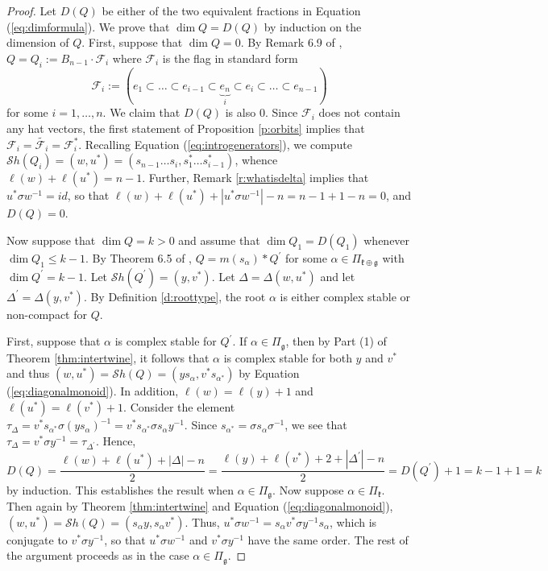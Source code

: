 \documentclass[12pt]{amsart}
\numberwithin{equation}{section}
\newcommand{\fk}{\mbox{${\mathfrak k}$}}
\newcommand{\fg}{\mbox{${\mathfrak g}$}}
\newcommand{\F}{\mathcal{F}}
\newcommand{\Sh}{\mathcal{S}h}
\begin{document}
\begin{proof}
Let $D(Q)$ be either of the two equivalent fractions in Equation (\ref{eq:dimformula}).   We prove that $\dim Q=D(Q)$ by induction on the dimension of $Q$.  First, suppose that $\dim Q=0$.  By Remark 6.9 of \cite{CE21II}, $Q=Q_{i}:=B_{n-1}\cdot \F_{i}$ where $\F_{i}$ is the flag in standard form 
$$
\F_{i}:=(e_{1}\subset\dots \subset e_{i-1}\subset\underbrace{e_{n}}_{i}\subset e_{i}\subset \dots \subset e_{n-1}) 
$$
for some $i=1,\dots, n$.  We claim that $D(Q)$ is also $0$. Since $\F_{i}$ does not contain any hat vectors, the first statement of Proposition \ref{p:orbits} implies that $\F_{i}=\widetilde{\F_{i}}=\F_{i}^{*}$.  Recalling Equation (\ref{eq:introgenerators}),  we compute $\Sh(Q_{i})=(w, u^{*})=(s_{n-1}\dots s_{i}, s_{1}^{*}\dots s_{i-1}^{*})$, whence $\ell(w)+\ell(u^{*})=n-1$.  Further, Remark \ref{r:whatisdelta} implies that $u^{*}\sigma w^{-1}=id$, so that $\ell(w)+\ell(u^{*})+|u^{*}\sigma w^{-1}|-n=n-1+1-n=0$, and $D(Q)=0.$

Now suppose that $\dim Q=k>0$ and assume that $\dim Q_1 = D(Q_1)$ whenever $\dim Q_1 \le k-1$.  By Theorem 6.5 of \cite{CE21II},  $Q=m(s_{\alpha})*Q^{\prime}$ for some $\alpha\in \Pi_{\fk\oplus \fg}$ with $\dim Q^{\prime}=k-1$.   Let 
$\Sh(Q^{\prime})=(y, v^{*})$.  Let $\Delta=\Delta(w,u^{*})$ and let $\Delta^{\prime}=\Delta(y,v^{*}).$
    By Definition \ref{d:roottype}, the root $\alpha$ is either complex stable or non-compact   for $Q$.  

 First, suppose that $\alpha$ is complex stable for $Q^{\prime}$.  If $\alpha \in \Pi_{\fg}$,  then by Part (1) of Theorem \ref{thm:intertwine}, it follows that $\alpha$ is complex stable for both $y$ and $v^{*}$ and thus $(w,u^*)=\Sh(Q)=(ys_{\alpha}, v^{*}s_{\alpha^{*}})$
by Equation (\ref{eq:diagonalmonoid}).   In addition, $\ell(w)=\ell(y)+1$ and $\ell(u^*)=\ell(v^*)+1.$  Consider the element 
 $\tau_{\Delta}=v^{*}s_{\alpha^{*}}\sigma (ys_{\alpha})^{-1}=v^{*}s_{\alpha^{*}}\sigma s_{\alpha} y^{-1}$.  Since
 $s_{\alpha^{*}}=\sigma s_{\alpha}\sigma^{-1}$, we see that $\tau_{\Delta}=v^{*}\sigma y^{-1}=\tau_{\Delta^{\prime}}$. 
Hence,
$$
D(Q)=\frac{\ell(w) + \ell(u^{*}) + |\Delta| - n}{2}=\frac{\ell(y)+\ell(v^{*})+2 + |\Delta^{\prime}|-n}{2}=D(Q^{\prime})+1=k-1+1=k
$$
by induction.  This establishes the result when $\alpha \in \Pi_{\fg}.$   Now suppose $\alpha \in \Pi_{\fk}.$   Then again by Theorem \ref{thm:intertwine} and Equation (\ref{eq:diagonalmonoid}),
 $(w,u^*)=\Sh(Q)=(s_{\alpha}y,s_{\alpha}v^{*}).$  Thus, $u^*\sigma w^{-1}=s_{\alpha}v^{*}\sigma y^{-1}s_{\alpha}$, which is conjugate to $v^*\sigma y^{-1}$, so that
$u^{*}\sigma w^{-1}$ and $v^*\sigma y^{-1}$ have the same order.  The rest of the argument proceeds as in the case $\alpha \in \Pi_{\fg}.$ 



\end{proof}
\end{document}

